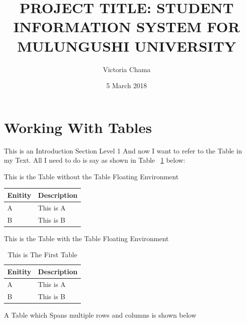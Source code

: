 \documentclass{article}
\title{PROJECT TITLE: STUDENT INFORMATION SYSTEM FOR MULUNGUSHI UNIVERSITY}
\author{Victoria Chama}
\date{5 March 2018}
\begin{document}
	
		\maketitle
	
	\section{Working With Tables}
	This is an Introduction Section Level 1
	And now I want to refer to the Table in my Text. All I need to do is say as shown in Table ~\ref{first_table} below:
	
	This is the Table without the Table Floating Environment
	
	\vspace{0.4cm}
	
	\begin{tabular}{|l|l|}
		\hline
		Enitity & Description \\
		\hline
		A & This is A \\
		\hline
		B & This is B \\
		\hline
	\end{tabular}


	This is the Table with the Table Floating Environment
	\begin{table}[htbp]
		\caption{This is The First Table}
		\label{first_table}
		\begin{center}
			
				\begin{tabular}{|l|l|}
				\hline
				Enitity & Description \\
				\hline
				A & This is A \\
				\hline
				B & This is B \\
				\hline
			\end{tabular}
			
		\end{center}
	\end{table}

A Table which Spans multiple rows and columns is shown below
\end{document}
